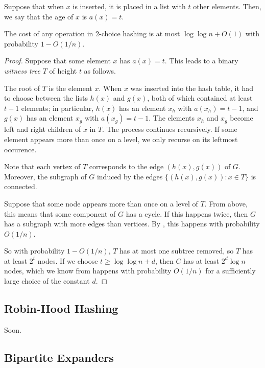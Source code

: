 \documentclass{patmorin}
\begin{document}
Suppose that when $x$ is inserted, it is placed in a list with $t$
other elements. Then, we say that the age of $x$ is $a(x) = t$.
\begin{thm}
  The cost of any operation in 2-choice hashing is at most
  $\log \log n + O(1)$ with probability $1 - O(1/n)$.
\end{thm}
\begin{proof}
  Suppose that some element $x$ has $a(x) = t$. This leads to a binary
  \emph{witness tree} $T$ of height $t$ as follows.

  The root of $T$ is the element $x$. When $x$ was inserted into the
  hash table, it had to choose between the lists $h(x)$ and $g(x)$,
  both of which contained at least $t - 1$ elements; in particular,
  $h(x)$ has an element $x_h$ with $a(x_h) = t - 1$, and $g(x)$ has an
  element $x_g$ with $a(x_g) = t - 1$. The elements $x_h$ and $x_g$
  become left and right children of $x$ in $T$. The process continues
  recursively. If some element appears more than once on a level, we
  only recurse on its leftmost occurence.

  Note that each vertex of $T$ corresponds to the edge $(h(x), g(x))$
  of $G$. Moreover, the subgraph of $G$ induced by the edges
  $\{(h(x), g(x)) : x \in T\}$ is connected.

  Suppose that some node appears more than once on a level of
  $T$. From above, this means that some component of $G$ has a
  cycle. If this happens twice, then $G$ has a subgraph with more
  edges than vertices. By , this happens
  with probability $O(1/n)$.

  So with probability $1 - O(1/n)$, $T$ has at most one subtree
  removed, so $T$ has at least $2^t$ nodes. If we choose
  $t \ge \log \log n + d$, then $C$ has at least $2^d \log n$ nodes,
  which we know from  happens with
  probability $O(1/n)$ for a sufficiently large choice of the constant
  $d$.
\end{proof}

\subsection{Robin-Hood Hashing}

Soon.


\subsection{Bipartite Expanders}
\end{document}
